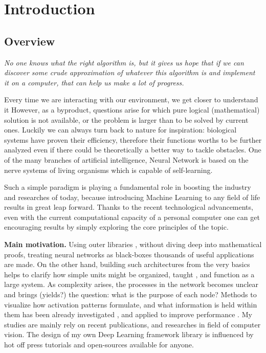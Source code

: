\chapter{Introduction}
\section{Overview}


\epigraph{\textit{No one knows what the right algorithm is, but it gives us hope that if we can discover some crude approximation of whatever this algorithm is and implement it on a computer, that can help us make a lot of progress.}}{}

Every time we are interacting with our environment, we get closer to understand it %
However, as a byproduct, questions arise for which pure logical (mathematical) solution is not available, or the problem is larger than to be solved by current ones.
Luckily we can always turn back to nature for inspiration: biological systems have proven their efficiency, therefore their functions worths to be further analyzed even if there could be theoretically a better way to tackle obstacles. 
One of the many branches of artificial intelligence, Neural Network is based on the nerve systems of living organisms which is capable of self-learning.

Such a simple paradigm is playing a fundamental role in boosting the industry and researches of today, because introducing Machine Learning to any field of life results in great leap forward. 
Thanks to the recent technological advancements, even with the current computational capacity of a personal computer one can get encouraging results by simply exploring the core principles of the topic.

\textbf{Main motivation.} Using outer libraries \cite{TF, torch, caffe}, without diving deep into mathematical proofs, treating neural networks as black-boxes thousands of useful applications \cite{haykin2004comprehensive} are made. 
On the other hand, building such architectures from the very basics helps to clarify how simple units might be organized, taught \cite{werbos1994roots}, and function \cite{hornik1989multilayer} as a large system. 
As complexity arises, the processes in the network becomes unclear and brings (yields?) the question: what is the purpose of each node? Methods to visualize how activation patterns formulate, and what information is held within them has been already investigated \cite{yosinski2015understanding}, and applied to improve performance \cite{zeiler2014visualizing}. My studies are mainly rely on recent publications, and researches in field of computer vision. The design of my own Deep Learning framework library is influenced by hot off press tutorials \cite{Goodfellow-et-al-2016-Book, deeplearningdotnet, nnsdl, stanfordlectures, gibiansky} and open-sources \cite{TF, torch, caffe} available for anyone. 


